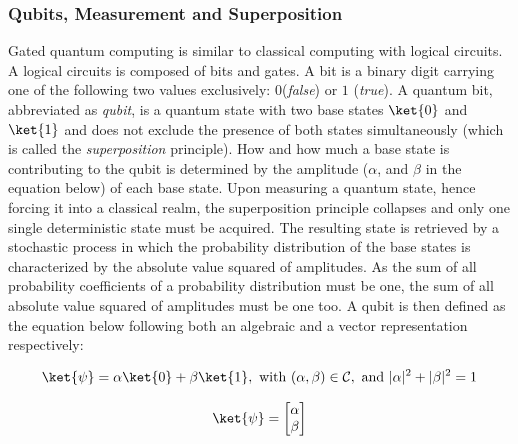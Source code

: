 \documentclass[../main.tex]{subfiles}
\begin{document}
\subsubsection*{Qubits, Measurement and Superposition}
Gated quantum computing is similar to classical computing with logical circuits. A logical circuits is composed of bits and gates. A bit is a binary digit carrying one of the following two values exclusively: $0$(\textit{false}) or $1$ (\textit{true}). A quantum bit, abbreviated as \emph{qubit}, is a quantum state with two base states $\ket{0}$ and $\ket{1}$ and does not exclude the presence of both states simultaneously (which is called the \emph{superposition} principle). How and how much a base state is contributing to the qubit is determined by the amplitude ($\alpha$, and $\beta$ in the equation below) of each base state. Upon measuring a quantum state, hence forcing it into a classical realm, the superposition principle collapses and only one single deterministic state must be acquired. The resulting state is retrieved by a stochastic process in which the probability distribution of the base states is characterized by the absolute value squared of amplitudes. As the sum of all probability coefficients of a probability distribution must be one, the sum of all absolute value squared of amplitudes must be one too. A qubit is then defined as the equation below following both an algebraic and a vector representation respectively:

\begin{equation}
    \ket{\psi} = \alpha \ket{0} + \beta \ket{1}, \, \,\text{with} \,\, (\alpha, \beta) \in \mathcal{C},
    \, \,\text{and} \, \, |\alpha|^2 + |\beta|^2 = 1   
    \label{eq: qubit_definition}
\end{equation}
 
\begin{equation}
    \ket{\psi} = \begin{bmatrix}\alpha \\ \beta \end{bmatrix}
    \label{eq: qubit_vector_representation}
\end{equation}
\end{document}
